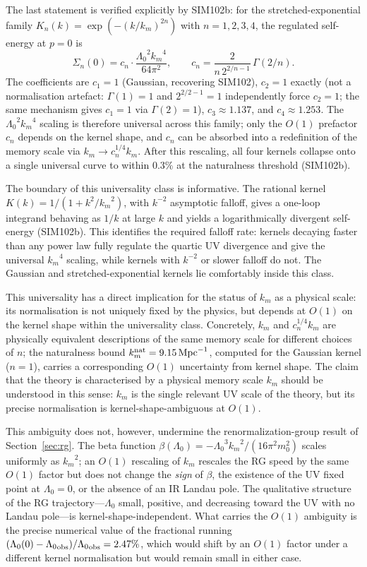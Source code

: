 \documentclass[12pt,a4paper]{article}
\newcommand{\Lz}{{\Lambda_0}}
\newcommand{\km}{{k_m}}
\newcommand{\knat}{{k_m^{\rm nat}}}
\begin{document}
The last statement is verified explicitly by SIM102b: for the
stretched-exponential family $K_n(k) = \exp(-(k/\km)^{2n})$ with
$n = 1, 2, 3, 4$, the regulated self-energy at $p=0$ is
\begin{equation}
\Sigma_n(0) = c_n \cdot \frac{\Lz^2 \km^4}{64 \pi^2},
\qquad
c_n = \frac{2}{n \, 2^{2/n - 1}} \, \Gamma(2/n).
\label{eq:sigma_n}
\end{equation}
The coefficients are $c_1 = 1$ (Gaussian, recovering SIM102), $c_2 = 1$
exactly (not a normalisation artefact: $\Gamma(1) = 1$ and $2^{2/2-1} = 1$
independently force $c_2 = 1$; the same mechanism gives $c_1 = 1$ via $\Gamma(2) = 1$),
$c_3 \approx 1.137$, and $c_4 \approx 1.253$. The
$\Lz^2 \km^4$ scaling is therefore universal across this family;
only the $O(1)$ prefactor $c_n$ depends on the kernel shape, and $c_n$
can be absorbed into a redefinition of the memory scale via
$\km \to c_n^{1/4} \km$. After this rescaling, all four kernels collapse
onto a single universal curve to within $0.3\%$ at the naturalness
threshold (SIM102b).

The boundary of this universality class is informative. The rational
kernel $K(k) = 1/(1 + k^2/\km^2)$, with $k^{-2}$ asymptotic falloff,
gives a one-loop integrand behaving as $1/k$ at large $k$ and yields a
logarithmically divergent self-energy (SIM102b). This identifies the
required falloff rate: kernels decaying faster than any power law fully
regulate the quartic UV divergence and give the universal $\km^4$
scaling, while kernels with $k^{-2}$ or slower falloff do not. The
Gaussian and stretched-exponential kernels lie comfortably inside this
class.

This universality has a direct implication for the status of $\km$ as a
physical scale: its normalisation is not uniquely fixed by the physics, but
depends at $O(1)$ on the kernel shape within the universality class.
Concretely, $\km$ and $c_n^{1/4}\km$ are physically equivalent descriptions
of the same memory scale for different choices of $n$; the naturalness bound
$\knat = 9.15\,\mathrm{Mpc}^{-1}$, computed for the Gaussian kernel ($n=1$),
carries a corresponding $O(1)$ uncertainty from kernel shape. The claim that
the theory is characterised by a physical memory scale $\km$ should be
understood in this sense: $\km$ is the single relevant UV scale of the theory,
but its precise normalisation is kernel-shape-ambiguous at $O(1)$.

This ambiguity does not, however, undermine the renormalization-group result
of Section~\ref{sec:rg}. The beta function $\beta(\Lz) = -\Lz^3\km^2/(16\pi^2
m_0^2)$ scales uniformly as $\km^2$; an $O(1)$ rescaling of $\km$ rescales the
RG speed by the same $O(1)$ factor but does not change the \emph{sign} of
$\beta$, the existence of the UV fixed point at $\Lz = 0$, or the absence of
an IR Landau pole. The qualitative structure of the RG trajectory---$\Lz$
small, positive, and decreasing toward the UV with no Landau pole---is
kernel-shape-independent. What carries the $O(1)$ ambiguity is the precise
numerical value of the fractional running $(\Lz(0) -
\Lz_{\rm obs})/\Lz_{\rm obs} = 2.47\%$, which would shift by an $O(1)$ factor
under a different kernel normalisation but would remain small in either case.
\end{document}
